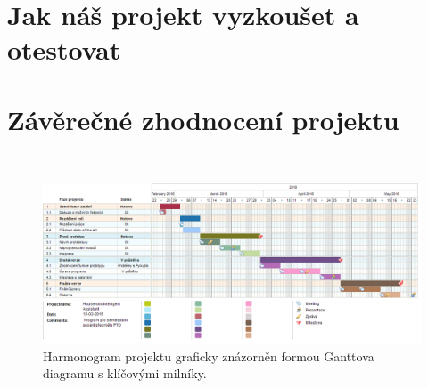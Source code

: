 \documentclass[12pt,a4paper]{article}
\begin{document}
\section{Jak náš projekt vyzkoušet a otestovat}

\section{Závěrečné zhodnocení projektu}


\begin{landscape}
~\vfill
\begin{figure}[ht]
	\begin{center}
	\includegraphics[height = 0.6\textheight ]{PTO-Gantt.png}
	\caption{Harmonogram projektu graficky znázorněn formou Ganttova diagramu s klíčovými milníky.}
	\label{fig:diagram_gantt}
	\end{center}
\end{figure}
\vfill
\end{landscape}
\end{document}
